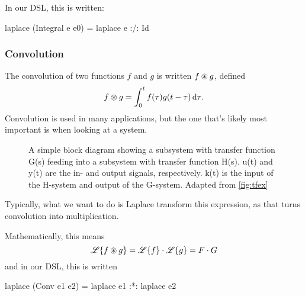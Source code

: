 In our DSL, this is written:
\begin{code}
laplace (Integral e e0) = laplace e :/: Id 
\end{code}

\subsubsection{Convolution}\label{sec:convol}
The convolution of two functions $f$ and $g$ is written $f \circledast g$, defined
\begin{equation*}
f \circledast g = \int_0^t f(\tau) g(t-\tau) \, \dd\tau.
\end{equation*}
Convolution is used in many applications, but the one that's likely most
important is when looking at a system. 

\begin{figure}[H]
\centering
{}
\caption{A simple block diagram showing a subsystem with transfer function G(s)
  feeding into a subsystem with transfer function H(s). u(t) and y(t) are the
  in- and output signals, respectively. k(t) is the input of the H-system and
  output of the G-system. Adapted from \ref{fig:tfex}}
\label{fig:conv-system}
\end{figure}


Typically, what we want to do is Laplace transform this expression, as that
turns convolution into multiplication.

Mathematically, this means
\begin{equation*}
 \mathscr{L}\{f \circledast g\} = \mathscr{L}\{f\} \cdot \mathscr{L} \{g\} = F \cdot G
\end{equation*}
and in our DSL, this is written
\begin{code}
laplace (Conv e1 e2) = laplace e1 :*: laplace e2
\end{code}

